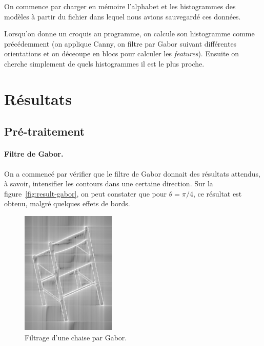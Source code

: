 \documentclass[12pt, a4paper, oneside]{article}
\begin{document}
On commence par charger en mémoire l'alphabet et les histogrammes des modèles à partir du fichier dans lequel nous avions sauvegardé ces données.

Lorsqu'on donne un croquis au programme, on calcule son histogramme comme précédemment (on applique Canny, on filtre par Gabor suivant différentes orientations et on déceoupe en blocs pour calculer les \emph{features}).
Ensuite on cherche simplement de quels histogrammes il est le plus proche.


\section{Résultats}

\subsection{Pré-traitement}

\paragraph{Filtre de Gabor.}
On a commencé par vérifier que le filtre de Gabor donnait des résultats attendus, à savoir, intensifier les contours dans une certaine direction.
Sur la figure~\vref{fig:result-gabor}, on peut constater que pour $\theta = \pi/4$, ce résultat est obtenu, malgré quelques effets de bords.
\begin{figure}
    \begin{center}
        \includegraphics[width=0.4\textwidth]{images/chair-gabor}
        \caption{Filtrage d'une chaise par Gabor.\label{fig:result-gabor}}
    \end{center}
\end{figure}
\end{document}
